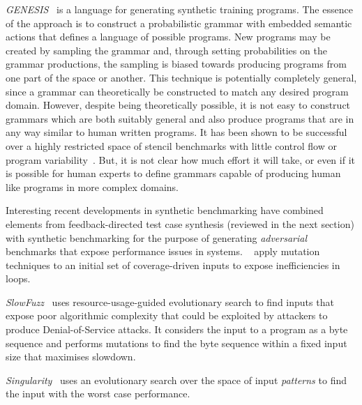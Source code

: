 \emph{GENESIS}~\cite{Chiu2015} is a language for generating synthetic training programs. The essence of the approach is to construct a probabilistic grammar with embedded semantic actions that defines a language of possible programs. New programs may be created by sampling the grammar and, through setting probabilities on the grammar productions, the sampling is biased towards producing programs from one part of the space or another. This technique is potentially completely general, since a grammar can theoretically be constructed to match any desired program domain. However, despite being theoretically possible, it is not easy to construct grammars which are both suitably general and also produce programs that are in any way similar to human written programs. It has been shown to be successful over a highly restricted space of stencil benchmarks with little control flow or program variability~\cite{Garvey2015b,Falch2015,Cummins2015}. But, it is not clear how much effort it will take, or even if it is possible for human experts to define grammars capable of producing human like programs in more complex domains.

Interesting recent developments in synthetic benchmarking have combined elements from feedback-directed test case synthesis (reviewed in the next section) with synthetic benchmarking for the purpose of generating \emph{adversarial} benchmarks that expose performance issues in systems.
\citeauthor{Dhok2016}~\cite{Dhok2016} apply mutation techniques to an initial set of coverage-driven inputs to expose inefficiencies in loops.

\emph{SlowFuzz}~\cite{Petsios2017} uses resource-usage-guided evolutionary search to find inputs that expose poor algorithmic complexity that could be exploited by attackers to produce Denial-of-Service attacks. It considers the input to a program as a byte sequence and performs mutations to find the byte sequence within a fixed input size that maximises slowdown.

\emph{Singularity}~\cite{Wei2018} uses an evolutionary search over the space of input \emph{patterns} to find the input with the worst case performance.

